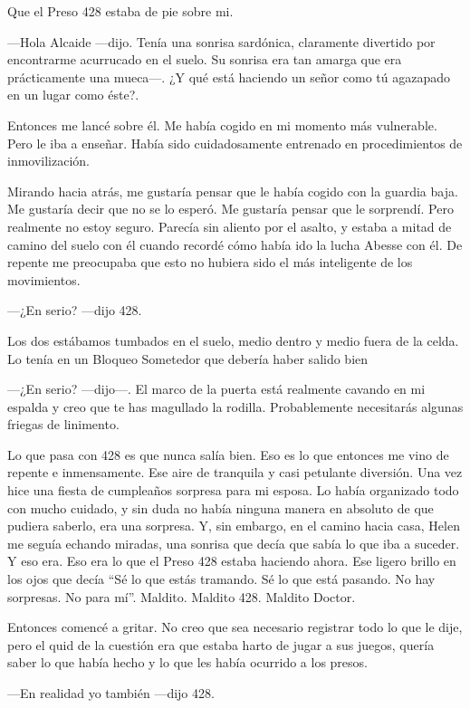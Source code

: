 Que el Preso 428 estaba de pie sobre mi.

---Hola Alcaide ---dijo. Tenía una sonrisa sardónica, claramente
divertido por encontrarme acurrucado en el suelo. Su sonrisa era tan
amarga que era prácticamente una mueca---. ¿Y qué está haciendo un señor
como tú agazapado en un lugar como éste?.

Entonces me lancé sobre él. Me había cogido en mi momento más
vulnerable. Pero le iba a enseñar. Había sido cuidadosamente entrenado
en procedimientos de inmovilización.

Mirando hacia atrás, me gustaría pensar que le había cogido con la
guardia baja. Me gustaría decir que no se lo esperó. Me gustaría pensar
que le sorprendí. Pero realmente no estoy seguro. Parecía sin aliento
por el asalto, y estaba a mitad de camino del suelo con él cuando
recordé cómo había ido la lucha Abesse con él. De repente me preocupaba
que esto no hubiera sido el más inteligente de los movimientos.

---¿En serio? ---dijo 428.

Los dos estábamos tumbados en el suelo, medio dentro y medio fuera de la
celda. Lo tenía en un Bloqueo Sometedor que debería haber salido bien

---¿En serio? ---dijo---. El marco de la puerta está realmente cavando
en mi espalda y creo que te has magullado la rodilla. Probablemente
necesitarás algunas friegas de linimento.

Lo que pasa con 428 es que nunca salía bien. Eso es lo que entonces me
vino de repente e inmensamente. Ese aire de tranquila y casi petulante
diversión. Una vez hice una fiesta de cumpleaños sorpresa para mi
esposa. Lo había organizado todo con mucho cuidado, y sin duda no había
ninguna manera en absoluto de que pudiera saberlo, era una sorpresa. Y,
sin embargo, en el camino hacia casa, Helen me seguía echando miradas,
una sonrisa que decía que sabía lo que iba a suceder. Y eso era. Eso era
lo que el Preso 428 estaba haciendo ahora. Ese ligero brillo en los ojos
que decía ``Sé lo que estás tramando. Sé lo que está pasando. No hay
sorpresas. No para mí''. Maldito. Maldito 428. Maldito Doctor.

Entonces comencé a gritar. No creo que sea necesario registrar todo lo
que le dije, pero el quid de la cuestión era que estaba harto de jugar a
sus juegos, quería saber lo que había hecho y lo que les había ocurrido
a los presos.

---En realidad yo también ---dijo 428.

